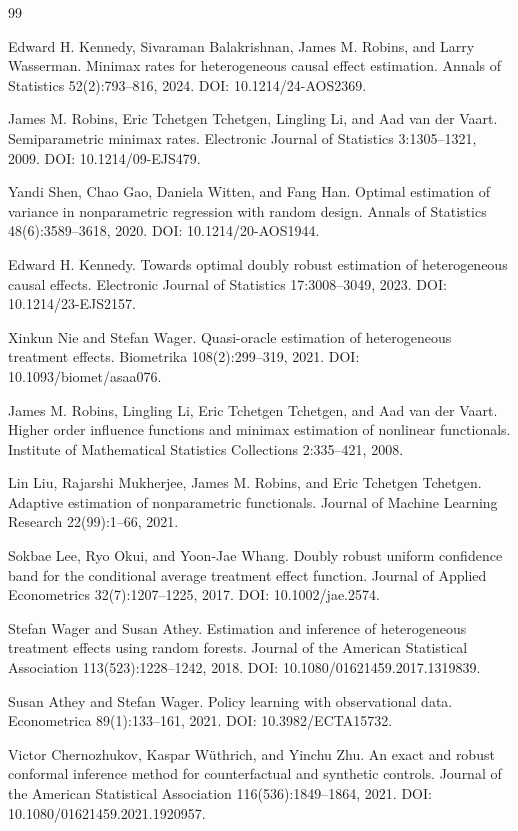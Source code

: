 \documentclass{article}
\begin{document}
\begin{thebibliography}{99}

   Edward H. Kennedy, Sivaraman Balakrishnan, James M. Robins, and Larry Wasserman. Minimax rates for heterogeneous causal effect estimation. Annals of Statistics 52(2):793--816, 2024. DOI: 10.1214/24-AOS2369.

   James M. Robins, Eric Tchetgen Tchetgen, Lingling Li, and Aad van der Vaart. Semiparametric minimax rates. Electronic Journal of Statistics 3:1305--1321, 2009. DOI: 10.1214/09-EJS479.

   Yandi Shen, Chao Gao, Daniela Witten, and Fang Han. Optimal estimation of variance in nonparametric regression with random design. Annals of Statistics 48(6):3589--3618, 2020. DOI: 10.1214/20-AOS1944.

   Edward H. Kennedy. Towards optimal doubly robust estimation of heterogeneous causal effects. Electronic Journal of Statistics 17:3008--3049, 2023. DOI: 10.1214/23-EJS2157.

   Xinkun Nie and Stefan Wager. Quasi-oracle estimation of heterogeneous treatment effects. Biometrika 108(2):299--319, 2021. DOI: 10.1093/biomet/asaa076.

   James M. Robins, Lingling Li, Eric Tchetgen Tchetgen, and Aad van der Vaart. Higher order influence functions and minimax estimation of nonlinear functionals. Institute of Mathematical Statistics Collections 2:335--421, 2008.

   Lin Liu, Rajarshi Mukherjee, James M. Robins, and Eric Tchetgen Tchetgen. Adaptive estimation of nonparametric functionals. Journal of Machine Learning Research 22(99):1--66, 2021.

   Sokbae Lee, Ryo Okui, and Yoon-Jae Whang. Doubly robust uniform confidence band for the conditional average treatment effect function. Journal of Applied Econometrics 32(7):1207--1225, 2017. DOI: 10.1002/jae.2574.

   Stefan Wager and Susan Athey. Estimation and inference of heterogeneous treatment effects using random forests. Journal of the American Statistical Association 113(523):1228--1242, 2018. DOI: 10.1080/01621459.2017.1319839.

   Susan Athey and Stefan Wager. Policy learning with observational data. Econometrica 89(1):133--161, 2021. DOI: 10.3982/ECTA15732.

   Victor Chernozhukov, Kaspar W\"uthrich, and Yinchu Zhu. An exact and robust conformal inference method for counterfactual and synthetic controls. Journal of the American Statistical Association 116(536):1849--1864, 2021. DOI: 10.1080/01621459.2021.1920957.

\end{thebibliography}
\end{document}

